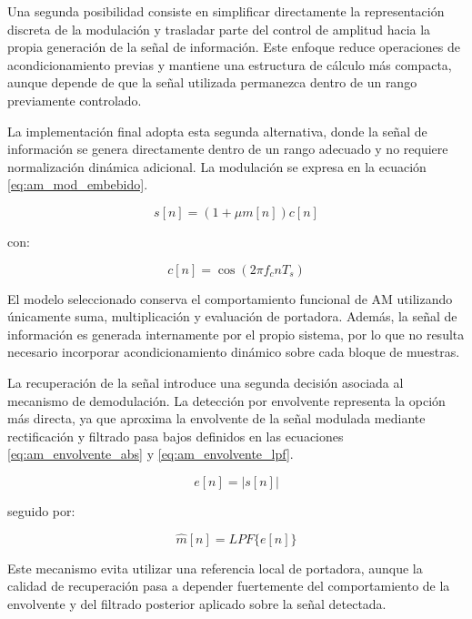 Una segunda posibilidad consiste en simplificar directamente la representación discreta de la modulación y trasladar parte del control de amplitud hacia la propia generación de la señal de información. Este enfoque reduce operaciones de acondicionamiento previas y mantiene una estructura de cálculo más compacta, aunque depende de que la señal utilizada permanezca dentro de un rango previamente controlado.

La implementación final adopta esta segunda alternativa, donde la señal de información se genera directamente dentro de un rango adecuado y no requiere normalización dinámica adicional. La modulación se expresa en la ecuación \eqref{eq:am_mod_embebido}.

\begin{equation}
s[n] = \left(1 + \mu m[n]\right)c[n]
\label{eq:am_mod_embebido}
\end{equation}

con:

\begin{equation}
c[n] = \cos(2\pi f_c nT_s)
\label{eq:am_portadora}
\end{equation}

El modelo seleccionado conserva el comportamiento funcional de AM utilizando únicamente suma, multiplicación y evaluación de portadora. Además, la señal de información es generada internamente por el propio sistema, por lo que no resulta necesario incorporar acondicionamiento dinámico sobre cada bloque de muestras.

La recuperación de la señal introduce una segunda decisión asociada al mecanismo de demodulación. La detección por envolvente representa la opción más directa, ya que aproxima la envolvente de la señal modulada mediante rectificación y filtrado pasa bajos definidos en las ecuaciones \eqref{eq:am_envolvente_abs} y \eqref{eq:am_envolvente_lpf}.

\begin{equation}
e[n] = |s[n]|
\label{eq:am_envolvente_abs}
\end{equation}

seguido por:

\begin{equation}
\hat{m}[n] = LPF\{e[n]\}
\label{eq:am_envolvente_lpf}
\end{equation}

Este mecanismo evita utilizar una referencia local de portadora, aunque la calidad de recuperación pasa a depender fuertemente del comportamiento de la envolvente y del filtrado posterior aplicado sobre la señal detectada.

